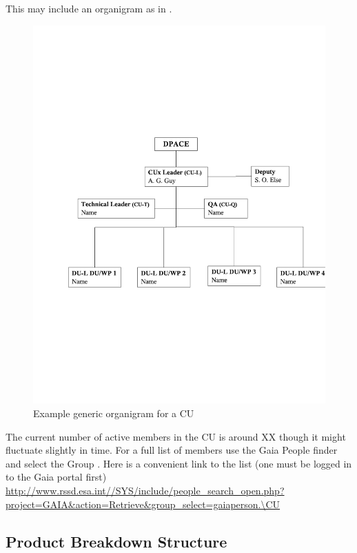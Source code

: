 \documentclass[DM,lsstdraft,SDP]{lsstdoc}
\begin{document}
This may include an organigram as in .

  \begin{figure}[htbp]
  \begin{center}
    \includegraphics[scale=0.5,trim=0 6cm 0 0]{images/organigram}
      \caption{Example generic organigram for a CU  \label{fig:orgdiag}}
  \end{center}

   \end{figure}

The current number of active members in the CU is around XX though
it might fluctuate slightly in time. For a full list of members use
the Gaia People finder and select the Group \CU. Here is a
convenient link to the list (one must be logged in to the Gaia
portal first)
\url{http://www.rssd.esa.int//SYS/include/people_search_open.php?project=GAIA&action=Retrieve&group_select=gaiaperson.\CU}


\subsection{Product Breakdown Structure\label{sect:decomp}}
\end{document}
